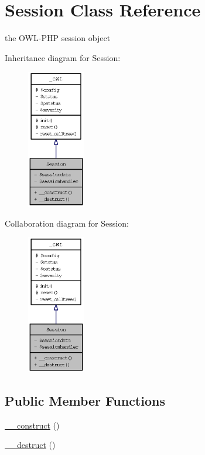 \hypertarget{classSession}{
\section{Session Class Reference}
\label{classSession}
}
the OWL-PHP session object  


Inheritance diagram for Session:\nopagebreak
\begin{figure}[H]
\begin{center}
\leavevmode
\includegraphics[width=72pt]{classSession__inherit__graph}
\end{center}
\end{figure}
Collaboration diagram for Session:\nopagebreak
\begin{figure}[H]
\begin{center}
\leavevmode
\includegraphics[width=72pt]{classSession__coll__graph}
\end{center}
\end{figure}
\subsection*{Public Member Functions}
\begin{CompactItemize}
\item 
\hyperlink{classSession_36373ba15d6c8f932aeea02d7320d7c8}{\_\-\_\-construct} ()
\item 
\hyperlink{classSession_a498272c85524e4700abc3363883165b}{\_\-\_\-destruct} ()
\end{CompactItemize}
